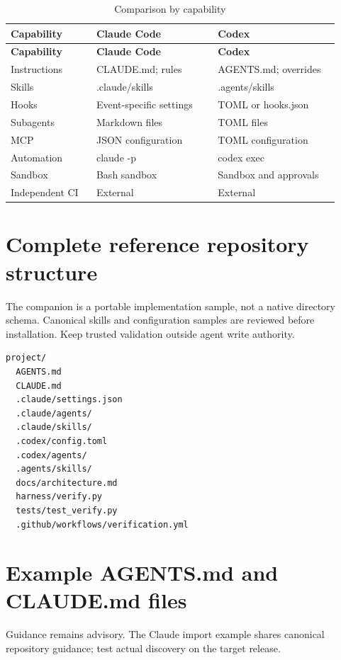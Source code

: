 \documentclass[11pt,letterpaper]{article}
\begin{document}
\begin{longtable}{@{}>{\raggedright\arraybackslash}p{0.24\linewidth}>{\raggedright\arraybackslash}p{0.34\linewidth}>{\raggedright\arraybackslash}p{0.34\linewidth}@{}}
\caption{Comparison by capability}\\\toprule
\textbf{Capability} & \textbf{Claude Code} & \textbf{Codex}\\\midrule\endfirsthead\toprule
\textbf{Capability} & \textbf{Claude Code} & \textbf{Codex}\\\midrule\endhead\bottomrule\endfoot
Instructions & CLAUDE.md; rules \cite{cmem} & AGENTS.md; overrides \cite{oagents}\\
Skills & .claude/skills \cite{cskills} & .agents/skills \cite{oskills}\\
Hooks & Event-specific settings \cite{chooks} & TOML or hooks.json \cite{ohooks}\\
Subagents & Markdown files \cite{cagents} & TOML files \cite{osub}\\
MCP & JSON configuration \cite{cmcp} & TOML configuration \cite{omcp}\\
Automation & claude -p \cite{chead} & codex exec \cite{oexec}\\
Sandbox & Bash sandbox \cite{csandbox} & Sandbox and approvals \cite{osec}\\
Independent CI & External & External\\
\end{longtable}
\clearpage\section{Complete reference repository structure}
The companion is a portable implementation sample, not a native directory schema. Canonical skills and configuration samples are reviewed before installation. Keep trusted validation outside agent write authority.

\begin{lstlisting}
project/
  AGENTS.md
  CLAUDE.md
  .claude/settings.json
  .claude/agents/
  .claude/skills/
  .codex/config.toml
  .codex/agents/
  .agents/skills/
  docs/architecture.md
  harness/verify.py
  tests/test_verify.py
  .github/workflows/verification.yml
\end{lstlisting}
\clearpage\section{Example AGENTS.md and CLAUDE.md files}
Guidance remains advisory. The Claude import example shares canonical repository guidance; test actual discovery on the target release.
\end{document}
